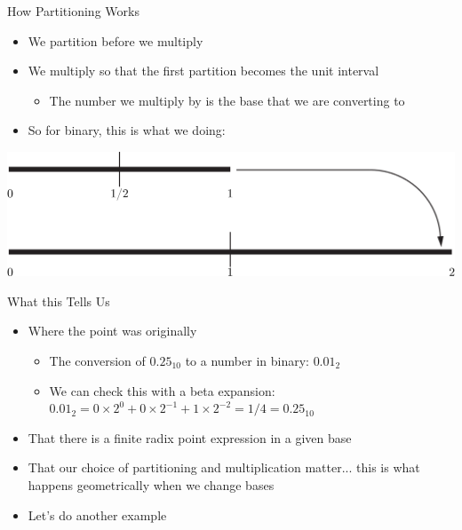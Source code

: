 \documentclass{beamer}
\begin{document}
\begin{frame}{How Partitioning Works}
  \begin{itemize}
    \item We partition before we multiply \pause
    \item We multiply so that the first partition becomes the unit interval \pause
    \begin{itemize}
      \item The number we multiply by is the base that we are converting to \pause
    \end{itemize}
    \item So for binary, this is what we doing:
  \end{itemize}
  \includegraphics[width=\textwidth]{images/partitioning/partitioning}
\end{frame}

\begin{frame}{What this Tells Us}
  \begin{itemize}
    \item Where the point was originally \pause
    \begin{itemize}
      \item The conversion of $0.25_{10}$ to a number in binary: $0.01_2$
      \item We can check this with a beta expansion: $0.01_2 = 0\times2^{0} + 0\times2^{-1} + 1\times2^{-2} = 1/4 = 0.25_{10}$
    \end{itemize} \pause
  \item That there is a finite radix point expression in a given base \pause
  \item That our choice of partitioning and multiplication matter... this is what happens geometrically when we change bases \pause
  \item Let's do another example
  \end{itemize}
\end{frame}
\end{document}
